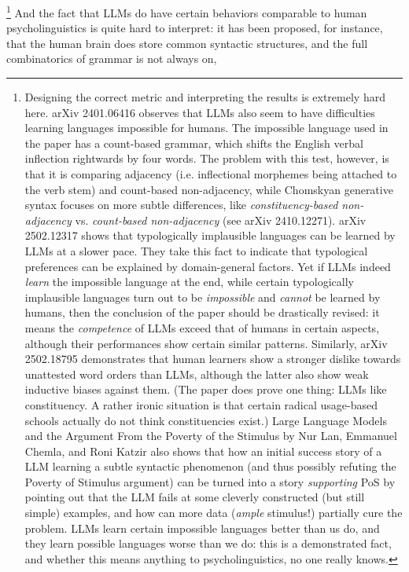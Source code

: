 \documentclass[hyperref, a4paper, 12pt]{report}
\begin{document}
\footnote{
    Designing the correct metric and interpreting the results is extremely hard here.
    arXiv 2401.06416 observes that LLMs also seem to have difficulties learning languages impossible for humans.
    The impossible language used in the paper has a count-based grammar,
    which shifts the English verbal inflection rightwards by four words.
    The problem with this test, however, is that it is comparing adjacency (i.e. inflectional morphemes being attached to the verb stem) and count-based non-adjacency,
    while Chomskyan generative syntax focuses on more subtle differences,
    like \emph{constituency-based non-adjacency} vs. \emph{count-based non-adjacency}
    (see arXiv 2410.12271).
    arXiv 2502.12317 shows that typologically implausible languages can be learned by LLMs at a slower pace.
    They take this fact to indicate that typological preferences can be explained by domain-general factors.
    Yet if LLMs indeed \emph{learn} the impossible language at the end,
    while certain typologically implausible languages turn out to be \emph{impossible} and \emph{cannot} be learned by humans,
    then the conclusion of the paper should be drastically revised:
    it means the \emph{competence} of LLMs exceed that of humans in certain aspects,
    although their performances show certain similar patterns.
    Similarly, arXiv 2502.18795 demonstrates that human learners show a stronger dislike towards unattested word orders than LLMs,
    although the latter also show weak inductive biases against them.
    (The paper does prove one thing: LLMs like constituency.
    A rather ironic situation is that certain radical usage-based schools actually do not think constituencies exist.)
    Large Language Models and the Argument From the Poverty of the Stimulus by Nur Lan, Emmanuel Chemla, and Roni Katzir also shows that 
    how an initial success story of a LLM learning a subtle syntactic phenomenon
    (and thus possibly refuting the Poverty of Stimulus argument)
    can be turned into a story \emph{supporting} PoS by pointing out that the LLM
    fails at some cleverly constructed (but still simple) examples,
    and how can more data (\emph{ample} stimulus!) partially cure the problem.
    LLMs learn certain impossible languages better than us do,
    and they learn possible languages worse than we do:
    this is a demonstrated fact,
    and whether this means anything to psycholinguistics,
    no one really knows.
}
And the fact that LLMs do have certain behaviors comparable to human psycholinguistics
is quite hard to interpret:
it has been proposed, for instance, that the human brain does store common syntactic structures, and the full combinatorics of grammar is not always on,
\end{document}
